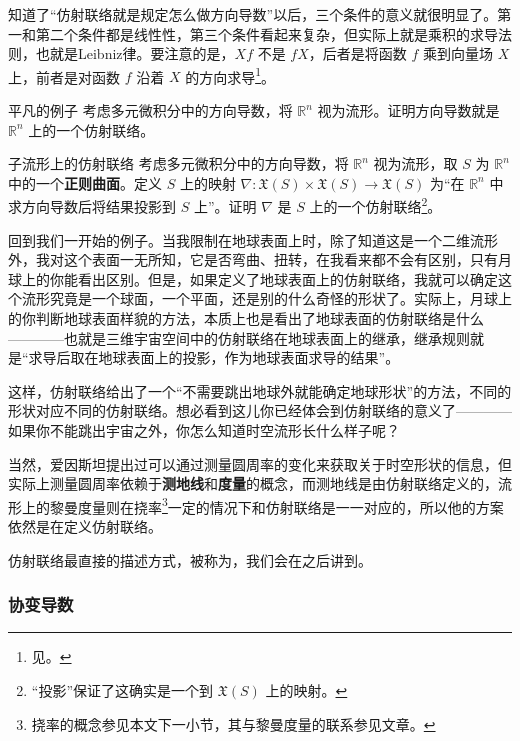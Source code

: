 知道了“仿射联络就是规定怎么做方向导数”以后，三个条件的意义就很明显了。第一和第二个条件都是线性性，第三个条件看起来复杂，但实际上就是乘积的求导法则，也就是Leibniz律。要注意的是，$Xf$ 不是 $fX$，后者是将函数 $f$ 乘到向量场 $X$ 上，前者是对函数 $f$ 沿着 $X$ 的方向求导\footnote{见。}。


\begin{exercise}{平凡的例子}
考虑多元微积分中的方向导数，将 $\mathbb{R}^n$ 视为流形。证明方向导数就是 $\mathbb{R}^n$ 上的一个仿射联络。
\end{exercise}

\begin{exercise}{子流形上的仿射联络}
考虑多元微积分中的方向导数，将 $\mathbb{R}^n$ 视为流形，取 $S$ 为 $\mathbb{R}^n$ 中的一个\textbf{正则曲面}。定义 $S$ 上的映射 $\nabla:\mathfrak{X}(S)\times\mathfrak{X}(S)\to\mathfrak{X}(S)$ 为“在 $\mathbb{R}^n$ 中求方向导数后将结果投影到 $S$ 上”。证明 $\nabla$ 是 $S$ 上的一个仿射联络\footnote{“投影”保证了这确实是一个到 $\mathfrak{X}(S)$ 上的映射。}。
\end{exercise}

回到我们一开始的例子。当我限制在地球表面上时，除了知道这是一个二维流形外，我对这个表面一无所知，它是否弯曲、扭转，在我看来都不会有区别，只有月球上的你能看出区别。但是，如果定义了地球表面上的仿射联络，我就可以确定这个流形究竟是一个球面，一个平面，还是别的什么奇怪的形状了。实际上，月球上的你判断地球表面样貌的方法，本质上也是看出了地球表面的仿射联络是什么————也就是三维宇宙空间中的仿射联络在地球表面上的继承，继承规则就是“求导后取在地球表面上的投影，作为地球表面求导的结果”。

这样，仿射联络给出了一个“不需要跳出地球外就能确定地球形状”的方法，不同的形状对应不同的仿射联络。想必看到这儿你已经体会到仿射联络的意义了————如果你不能跳出宇宙之外，你怎么知道时空流形长什么样子呢？

当然，爱因斯坦提出过可以通过测量圆周率的变化来获取关于时空形状的信息，但实际上测量圆周率依赖于\textbf{测地线}和\textbf{度量}的概念，而测地线是由仿射联络定义的，流形上的黎曼度量则在挠率\footnote{挠率的概念参见本文下一小节，其与黎曼度量的联系参见文章。}一定的情况下和仿射联络是一一对应的，所以他的方案依然是在定义仿射联络。

仿射联络最直接的描述方式，被称为，我们会在之后讲到。

\subsubsection{协变导数}

